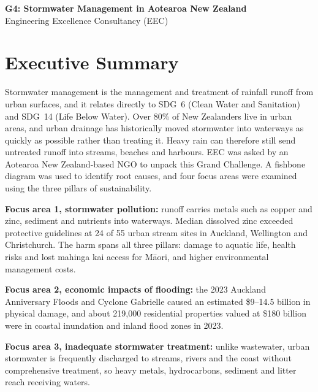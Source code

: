 \documentclass[11pt,a4paper]{article}
\begin{document}
\begin{center}
  {\Large\bfseries G4: Stormwater Management in Aotearoa New Zealand}\\[2pt]
  {\small Engineering Excellence Consultancy (EEC)}
\end{center}

\section*{Executive Summary}

Stormwater management is the management and treatment of rainfall runoff from urban surfaces, and it relates directly to SDG~6 (Clean Water and Sanitation) and SDG~14 (Life Below Water). Over 80\% of New Zealanders live in urban areas, and urban drainage has historically moved stormwater into waterways as quickly as possible rather than treating it. Heavy rain can therefore still send untreated runoff into streams, beaches and harbours. EEC was asked by an Aotearoa New Zealand-based NGO to unpack this Grand Challenge. A fishbone diagram was used to identify root causes, and four focus areas were examined using the three pillars of sustainability.

\textbf{Focus area 1, stormwater pollution:} runoff carries metals such as copper and zinc, sediment and nutrients into waterways. Median dissolved zinc exceeded protective guidelines at 24 of 55 urban stream sites in Auckland, Wellington and Christchurch. The harm spans all three pillars: damage to aquatic life, health risks and lost mahinga kai access for M\=aori, and higher environmental management costs.

\textbf{Focus area 2, economic impacts of flooding:} the 2023 Auckland Anniversary Floods and Cyclone Gabrielle caused an estimated \$9--14.5 billion in physical damage, and about 219,000 residential properties valued at \$180 billion were in coastal inundation and inland flood zones in 2023.

\textbf{Focus area 3, inadequate stormwater treatment:} unlike wastewater, urban stormwater is frequently discharged to streams, rivers and the coast without comprehensive treatment, so heavy metals, hydrocarbons, sediment and litter reach receiving waters.
\end{document}
